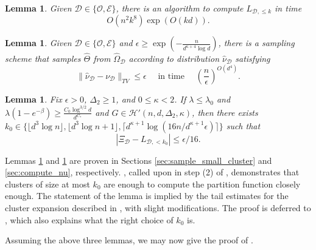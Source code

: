 \documentclass[reqno,a4paper,11pt]{amsart}
\newtheorem{lemma}[theorem]{Lemma}
\newcommand{\cD}{\mathcal{D}}
\newcommand{\cE}{\mathcal{E}}
\newcommand{\cH}{\mathcal{H}}
\newcommand{\cO}{\mathcal{O}}
\newcommand{\lam}{\lambda}
\newcommand{\ex}{\kappa}
\newcommand{\exx}{C_*}
\newcommand{\codeg}{\Delta_2}
\begin{document}
\begin{lemma} \label{lem:compute_L}
    Given $\cD \in \{\cO, \cE\}$, there is an algorithm to compute $L_{\cD, \leq k}$ in time 
    \[
    O(n^2 k^8) \exp(O(kd)).
    \]
\end{lemma}

\begin{lemma} \label{lem:compute_nu}
    Given $\cD \in \{\cO, \cE\}$ and $\epsilon \geq \exp\left( - \frac{n}{d^{\ex+4} \log d}\right)$, there is a sampling scheme that samples $\hat{\Theta}$ from $\hat{\Omega}_{\cD}$ according to distribution $\hat{\nu}_{\cD}$ satisfying 
    \[
    \lVert \hat{\nu}_{\cD} - \nu_{\cD} \rVert_{TV} \leq \epsilon \quad \text{ in time } \quad \left( \frac{n}{\epsilon}\right)^{O(d^4)}.
    \]
\end{lemma}

\begin{lemma}\label{lem:Kotecky}
    Fix $\epsilon>0$, $\codeg \geq 1$, and $0 \le \ex < 2$. If $\lam \le \lam_0$ and $\lam(1 - e^{-\beta}) \ge \frac{C_0 \log^{3/2}d}{d^{\exx}}$ and $G\in\cH'(n,d,\codeg,\ex)$, then there exists $k_0\in \{\lfloor d^3\log n\rfloor, \lfloor d^3\log n+1\rfloor, \lceil d^{\ex+1}\log(16n/d^{\ex+1}\epsilon)\rceil\}$ such that
    $$|\Xi_\cD-L_{\cD,< k_0}|\leq \epsilon/16.$$
\end{lemma}

Lemmas \ref{lem:compute_L} and \ref{lem:compute_nu} are proven in Sections \ref{sec:sample_small_cluster} and \ref{sec:compute_nu}, respectively. , called upon in step (2) of , demonstrates that clusters of size at most $k_0$ are enough to compute the partition function closely enough. The statement of the lemma is implied by the tail estimates for the cluster expansion described in \cite{GeKaSaWdo25}, with slight modifications. The proof is deferred to , which also explains what the right choice of $k_0$ is.

Assuming the above three lemmas, we may now give the proof of .
\end{document}
